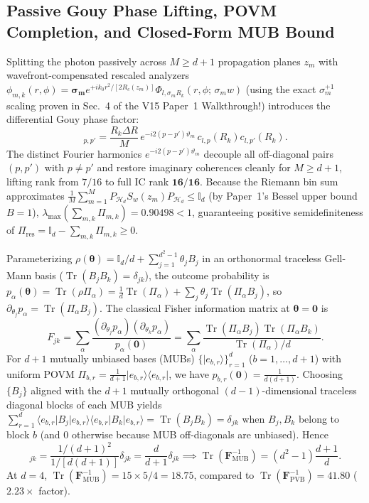 \documentclass[10pt,letterpaper]{article}
\newcommand{\ket}[1]{\lvert #1 \rangle}
\newcommand{\bra}[1]{\langle #1 \rvert}
\numberwithin{equation}{section}
\begin{document}
\subsection{Passive Gouy Phase Lifting, POVM Completion, and Closed-Form MUB Bound}
Splitting the photon passively across $M \ge d+1$ propagation planes $z_m$ with wavefront-compensated rescaled analyzers $\phi_{m,k}(r,\phi) = \mathbf{\sigma_m} e^{+ik_0 r^2/[2R_c(z_m)]}\Phi_{l,\sigma_m R_k}(r,\phi;\,\sigma_m w)$ (using the exact $\sigma_m^{+1}$ scaling proven in Sec.~4 of the V15 Paper~1 Walkthrough!) introduces the differential Gouy phase factor:
\begin{equation}
  [\Pi_{m,k}]_{p,p'} = \frac{R_k\Delta R}{M}\,e^{-i 2(p - p')\vartheta_m}\,c_{l,p}(R_k) c_{l,p'}(R_k).
\end{equation}
The distinct Fourier harmonics $e^{-i 2(p-p')\vartheta_m}$ decouple all off-diagonal pairs $(p,p')$ with $p \neq p'$ and restore imaginary coherences cleanly for $M \ge d+1$, lifting rank from $7/16$ to full IC rank $\mathbf{16/16}$. Because the Riemann bin sum approximates $\frac{1}{M}\sum_{m=1}^M P_{\mathcal{H}_d} S_w(z_m) P_{\mathcal{H}_d} \le \mathbb{I}_d$ (by Paper~1's Bessel upper bound $B = 1$), $\lambda_{\max}(\sum_{m,k}\Pi_{m,k}) = 0.90498 < 1$, guaranteeing positive semidefiniteness of $\Pi_{\mathrm{res}} = \mathbb{I}_d - \sum_{m,k}\Pi_{m,k} \ge 0$.

Parameterizing $\rho(\boldsymbol{\theta}) = \mathbb{I}_d/d + \sum_{j=1}^{d^2-1}\theta_j B_j$ in an orthonormal traceless Gell-Mann basis ($\operatorname{Tr}(B_j B_k) = \delta_{jk}$), the outcome probability is $p_\alpha(\boldsymbol{\theta}) = \operatorname{Tr}(\rho\Pi_\alpha) = \frac{1}{d}\operatorname{Tr}(\Pi_\alpha) + \sum_j \theta_j \operatorname{Tr}(\Pi_\alpha B_j)$, so $\partial_{\theta_j} p_\alpha = \operatorname{Tr}(\Pi_\alpha B_j)$. The classical Fisher information matrix at $\boldsymbol{\theta} = \mathbf{0}$ is
\begin{equation}
  F_{jk} = \sum_\alpha \frac{(\partial_{\theta_j} p_\alpha)(\partial_{\theta_k} p_\alpha)}{p_\alpha(\mathbf{0})} = \sum_\alpha \frac{\operatorname{Tr}(\Pi_\alpha B_j)\operatorname{Tr}(\Pi_\alpha B_k)}{\operatorname{Tr}(\Pi_\alpha)/d}.
\end{equation}
For $d+1$ mutually unbiased bases (MUBs) $\{\ket{e_{b,r}}\}_{r=1}^d$ ($b=1,\dots,d+1$) with uniform POVM $\Pi_{b,r} = \frac{1}{d+1}\ket{e_{b,r}}\bra{e_{b,r}}$, we have $p_{b,r}(\mathbf{0}) = \frac{1}{d(d+1)}$. Choosing $\{B_j\}$ aligned with the $d+1$ mutually orthogonal $(d-1)$-dimensional traceless diagonal blocks of each MUB yields $\sum_{r=1}^d \bra{e_{b,r}}B_j\ket{e_{b,r}}\bra{e_{b,r}}B_k\ket{e_{b,r}} = \operatorname{Tr}(B_j B_k) = \delta_{jk}$ when $B_j, B_k$ belong to block $b$ (and $0$ otherwise because MUB off-diagonals are unbiased). Hence
\begin{equation}
  [\mathbf{F}_{\mathrm{MUB}}]_{jk} = \frac{1/(d+1)^2}{1/[d(d+1)]}\delta_{jk} = \frac{d}{d+1}\delta_{jk} \implies \operatorname{Tr}\!\left(\mathbf{F}_{\mathrm{MUB}}^{-1}\right) = (d^2 - 1)\frac{d+1}{d}.
\end{equation}
At $d=4$, $\operatorname{Tr}(\mathbf{F}_{\mathrm{MUB}}^{-1}) = 15\times 5/4 = 18.75$, compared to $\operatorname{Tr}(\mathbf{F}_{\mathrm{PVB}}^{-1}) = 41.80$ ($2.23\times$ factor).
\end{document}
